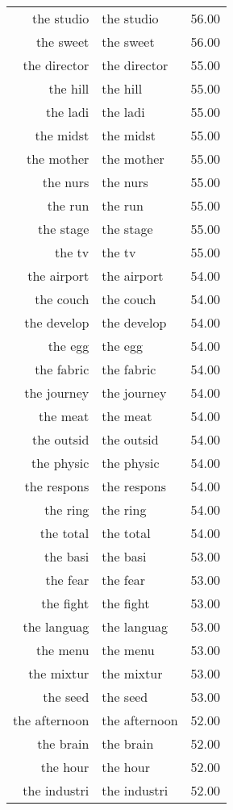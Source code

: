 \begin{table}[ht]
\begin{tabular}{rlr}
  the studio & the studio & 56.00 \\ 
  the sweet & the sweet & 56.00 \\ 
  the director & the director & 55.00 \\ 
  the hill & the hill & 55.00 \\ 
  the ladi & the ladi & 55.00 \\ 
  the midst & the midst & 55.00 \\ 
  the mother & the mother & 55.00 \\ 
  the nurs & the nurs & 55.00 \\ 
  the run & the run & 55.00 \\ 
  the stage & the stage & 55.00 \\ 
  the tv & the tv & 55.00 \\ 
  the airport & the airport & 54.00 \\ 
  the couch & the couch & 54.00 \\ 
  the develop & the develop & 54.00 \\ 
  the egg & the egg & 54.00 \\ 
  the fabric & the fabric & 54.00 \\ 
  the journey & the journey & 54.00 \\ 
  the meat & the meat & 54.00 \\ 
  the outsid & the outsid & 54.00 \\ 
  the physic & the physic & 54.00 \\ 
  the respons & the respons & 54.00 \\ 
  the ring & the ring & 54.00 \\ 
  the total & the total & 54.00 \\ 
  the basi & the basi & 53.00 \\ 
  the fear & the fear & 53.00 \\ 
  the fight & the fight & 53.00 \\ 
  the languag & the languag & 53.00 \\ 
  the menu & the menu & 53.00 \\ 
  the mixtur & the mixtur & 53.00 \\ 
  the seed & the seed & 53.00 \\ 
  the afternoon & the afternoon & 52.00 \\ 
  the brain & the brain & 52.00 \\ 
  the hour & the hour & 52.00 \\ 
  the industri & the industri & 52.00 \\ 

\end{tabular}
\end{table}
